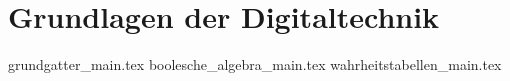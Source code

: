 
\part{Grundlagen der Digitaltechnik}
\label{part:grundlagen-digitaltechnik}

{grundgatter_main.tex}
{boolesche_algebra_main.tex}
{wahrheitstabellen_main.tex}